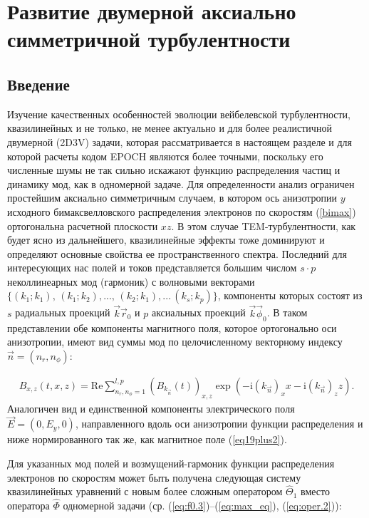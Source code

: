 \chapter{Развитие двумерной аксиально симметричной турбулентности}\label{ch:ch2}

\section{Введение}\label{sec:ch2/sec1}
Изучение качественных особенностей эволюции вейбелевской турбулентности, квазилинейных и не только, не менее актуально и для более реалистичной двумерной (2D3V) задачи, которая рассматривается в настоящем разделе и для которой расчеты кодом EPOCH являются более точными, поскольку его численные шумы не так сильно искажают функцию распределения частиц и динамику мод, как в одномерной задаче. 
Для определенности анализ ограничен простейшим аксиально симметричным случаем, в котором ось анизотропии $y$ исходного бимаксвелловского распределения электронов по скоростям (\ref{bimax}) ортогональна расчетной плоскости $xz$. 
В этом случае TEM-турбулентности, как будет ясно из дальнейшего, квазилинейные эффекты тоже доминируют и определяют основные свойства ее пространственного спектра. 
Последний для интересующих нас полей и токов представляется большим числом $s \cdot p$ неколлинеарных мод (гармоник) с волновыми векторами $\{ (k_{1}; k_{1}),\, (k_{1}; k_{2}),...,\, (k_{2}; k_{1}),...\, (k_{s}; k_{p}) \}$, компоненты которых состоят из $s$ радиальных проекций $\vec{k}\vec{r}_0$ и $p$ аксиальных проекций $\vec{k}\vec{\phi}_0$. 
В таком представлении обе компоненты магнитного поля, которое ортогонально оси анизотропии, имеют вид суммы мод по целочисленному векторному индексу $\vec{n}=(n_r,n_\phi)$:

\begin{align}
B_{x,z}(t,x,z) = \mathrm{Re} \sum^{l,p}_{n_r,n_\phi=1}\left(B_{k_{\vec{n}}}(t)\right)_{x,z}\exp(- \mathrm{i}\left(k_{\vec{n}}\right)_x x - \mathrm{i}\left(k_{\vec{n}}\right)_z z).
\end{align}
Аналогичен вид и единственной компоненты электрического поля $\vec{E}=(0, E_y, 0)$, направленного вдоль оси анизотропии функции распределения и ниже нормированного так же, как магнитное поле 
(\ref{eq19plus2}).

Для указанных мод полей и возмущений-гармоник функции распределения электронов по скоростям может быть получена следующая систему квазилинейных уравнений с новым более сложным оператором $\hat \Theta_1$ вместо оператора $\hat \Phi$ одномерной задачи (ср. (\ref{eq:f0.3})--(\ref{eq:max_eq}), (\ref{eq:oper.2})): 

